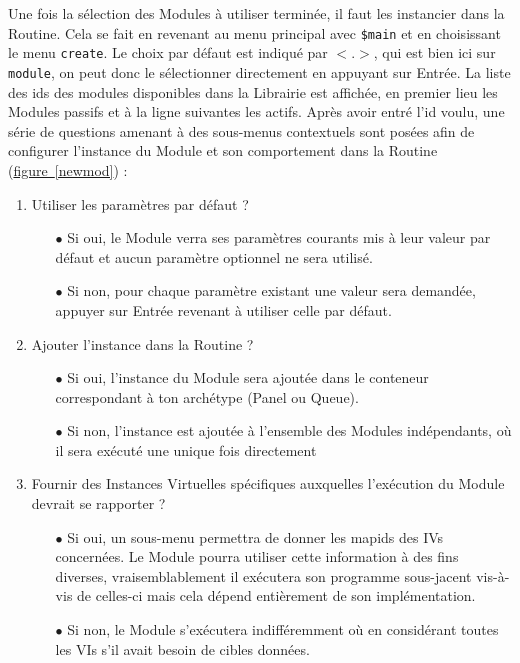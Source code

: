 \documentclass[]{article}
\newcommand{\wordlink}[2]{\hyperref[#1]{#2~\ref{#1}}}
\begin{document}
\par Une fois la sélection des Modules à utiliser terminée, il faut les instancier dans la Routine. Cela se fait en revenant au menu principal avec \texttt{\$main} et en choisissant le menu \texttt{create}. Le choix par défaut est indiqué par \texttt{$< . >$}, qui est bien ici sur \texttt{module}, on peut donc le sélectionner directement en appuyant sur Entrée. La liste des ids des modules disponibles dans la Librairie est affichée, en premier lieu les Modules passifs et à la ligne suivantes les actifs. Après avoir entré l'id voulu, une série de questions amenant à des sous-menus contextuels sont posées afin de configurer l'instance du Module et son comportement dans la Routine (\wordlink{newmod}{figure}) :\\
\begin{enumerate}
\item Utiliser les paramètres par défaut ?
	\begin{itemize}
	\item[$\bullet$] Si oui, le Module verra ses paramètres courants mis à leur valeur par défaut et aucun paramètre optionnel ne sera utilisé.
	\item[$\bullet$] Si non, pour chaque paramètre existant une valeur sera demandée, appuyer sur Entrée revenant à utiliser celle par défaut.
	\end{itemize}  
\vspace{0.2cm}
\item Ajouter l'instance dans la Routine ?
	\begin{itemize}
	\item[$\bullet$] Si oui, l'instance du Module sera ajoutée dans le conteneur correspondant à ton archétype (Panel ou Queue).
	\item[$\bullet$] Si non, l'instance est ajoutée à l'ensemble des Modules indépendants, où il sera exécuté une unique fois directement
	\end{itemize}
\vspace{0.2cm}
\item Fournir des Instances Virtuelles spécifiques auxquelles l'exécution du Module devrait se rapporter ?
	\begin{itemize}
	\item[$\bullet$] Si oui, un sous-menu permettra de donner les mapids des IVs concernées. Le Module pourra utiliser cette information à des fins diverses, vraisemblablement il exécutera son programme sous-jacent vis-à-vis de celles-ci mais cela dépend entièrement de son implémentation.
	\item[$\bullet$] Si non, le Module s'exécutera indifféremment où en considérant toutes les VIs s'il avait besoin de cibles données.

\end{itemize}
\end{enumerate}
\end{document}
